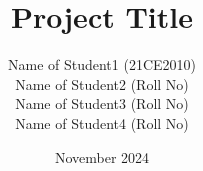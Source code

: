 

\clearpage{}  %



\title{Project Title}
\author{Name of Student1 (21CE2010)\\Name of Student2 (Roll No)\\Name of Student3 (Roll No)\\Name of Student4 (Roll No)}
\date{November 2024}



\thesis



\maketitle

